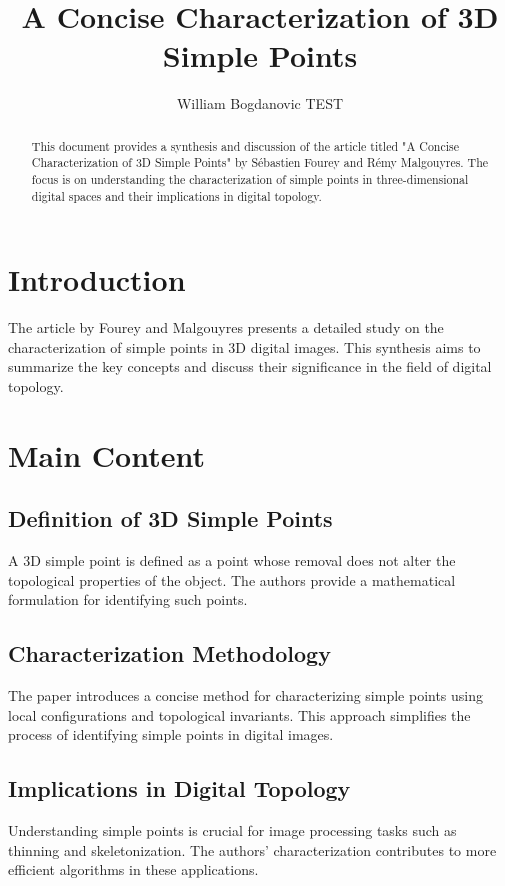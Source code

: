 \documentclass{llncs}
\begin{document}
\title{A Concise Characterization of 3D Simple Points}
\author{William Bogdanovic TEST}
\maketitle

\begin{abstract}
This document provides a synthesis and discussion of the article titled "A Concise Characterization of 3D Simple Points" by Sébastien Fourey and Rémy Malgouyres. The focus is on understanding the characterization of simple points in three-dimensional digital spaces and their implications in digital topology.
\end{abstract}

\section{Introduction}
The article by Fourey and Malgouyres presents a detailed study on the characterization of simple points in 3D digital images. This synthesis aims to summarize the key concepts and discuss their significance in the field of digital topology.

\section{Main Content}
\subsection{Definition of 3D Simple Points}
A 3D simple point is defined as a point whose removal does not alter the topological properties of the object. The authors provide a mathematical formulation for identifying such points.

\subsection{Characterization Methodology}
The paper introduces a concise method for characterizing simple points using local configurations and topological invariants. This approach simplifies the process of identifying simple points in digital images.

\subsection{Implications in Digital Topology}
Understanding simple points is crucial for image processing tasks such as thinning and skeletonization. The authors' characterization contributes to more efficient algorithms in these applications.
\end{document}
